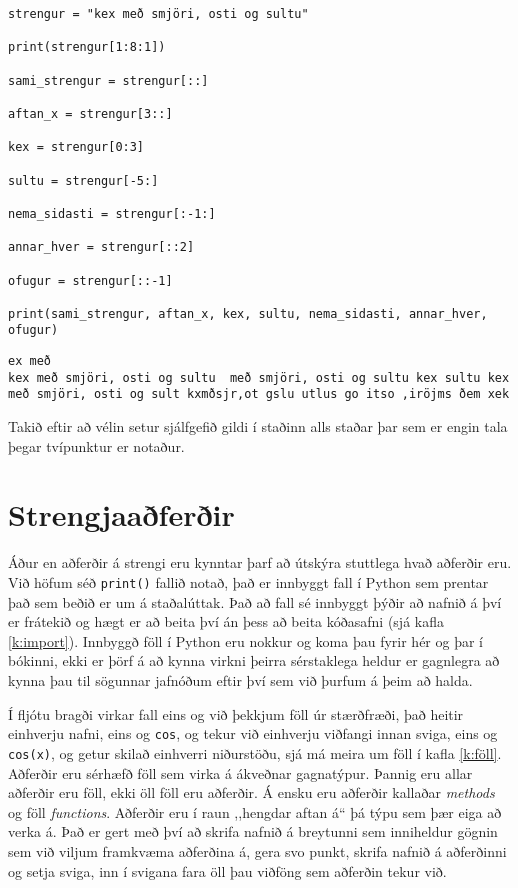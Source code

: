 \begin{lstlisting}[caption=Hlutstrengir, label=lst:hlutstrengir]
strengur = "kex með smjöri, osti og sultu"

print(strengur[1:8:1])

sami_strengur = strengur[::]

aftan_x = strengur[3::]

kex = strengur[0:3]

sultu = strengur[-5:]

nema_sidasti = strengur[:-1:]

annar_hver = strengur[::2]

ofugur = strengur[::-1]

print(sami_strengur, aftan_x, kex, sultu, nema_sidasti, annar_hver, ofugur)
\end{lstlisting}
\lstset{style=uttak}
\begin{lstlisting}
ex með 
kex með smjöri, osti og sultu  með smjöri, osti og sultu kex sultu kex með smjöri, osti og sult kxmðsjr,ot gslu utlus go itso ,iröjms ðem xek
\end{lstlisting}
\lstset{style=venjulegt}

Takið eftir að vélin setur sjálfgefið gildi í staðinn alls staðar þar sem er engin tala þegar tvípunktur er notaður.

\section{Strengjaaðferðir}\label{uk:strengjaaðferðir}
Áður en aðferðir á strengi eru kynntar þarf að útskýra stuttlega hvað aðferðir eru.
Við höfum séð \texttt{print()} fallið notað, það er innbyggt fall í Python sem prentar það sem beðið er um á staðalúttak.
Það að fall sé innbyggt þýðir að nafnið á því er frátekið og hægt er að beita því án þess að beita kóðasafni (sjá kafla \ref{k:import}).
Innbyggð föll í Python eru nokkur og koma þau fyrir hér og þar í bókinni, ekki er þörf á að kynna virkni þeirra sérstaklega heldur er gagnlegra að kynna þau til sögunnar jafnóðum eftir því sem við þurfum á þeim að halda.

Í fljótu bragði virkar fall eins og við þekkjum föll úr stærðfræði, það heitir einhverju nafni, eins og \texttt{cos}, og tekur við einhverju viðfangi innan sviga, eins og \texttt{cos(x)}, og getur skilað einhverri niðurstöðu, sjá má meira um föll í kafla \ref{k:föll}.
Aðferðir eru sérhæfð föll sem virka á ákveðnar gagnatýpur.
Þannig eru allar aðferðir eru föll, ekki öll föll eru aðferðir.
Á ensku eru aðferðir kallaðar \textit{methods} og föll \textit{functions}.
Aðferðir eru í raun ,,hengdar aftan á“ þá týpu sem þær eiga að verka á.
Það er gert með því að skrifa nafnið á breytunni sem inniheldur gögnin sem við viljum framkvæma aðferðina á, gera svo punkt, skrifa nafnið á aðferðinni og setja sviga, inn í svigana fara öll þau viðföng sem aðferðin tekur við.

